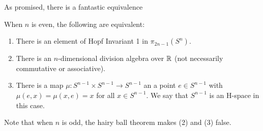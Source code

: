 As promised, there is a fantastic equivalence
\begin{Theorem}
  When $n$ is even, the following are equivalent:
  \begin{enumerate}
    \item There is an element of Hopf Invariant 1 in $\pi_{2n-1}(S^n)$.
    \item There is an $n$-dimensional division algebra over $\mathbb{R}$ (not necessarily commutative or associative).
    \item There is a map $\mu:S^{n-1}\times S^{n-1}\to S^{n-1}$ an a point $e\in S^{n-1}$ with $\mu(e,x)=\mu(x,e)=x$ for all $x\in S^{n-1}$.  We say that $S^{n-1}$ is an H-space in this case. 
  \end{enumerate}
\end{Theorem}
Note that when $n$ is odd, the hairy ball theorem makes (2) and (3) false.  


